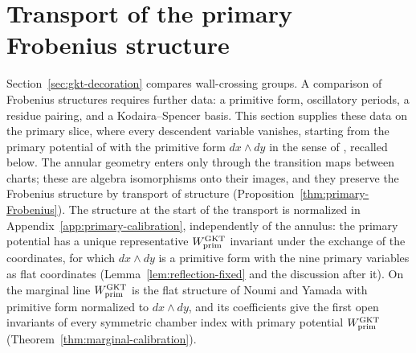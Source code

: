 \section{Transport of the primary Frobenius structure}
\label{sec:primary-frobenius}

Section~\ref{sec:gkt-decoration} compares wall-crossing groups.  A comparison
of Frobenius structures requires further data: a primitive form, oscillatory
periods, a residue pairing, and a Kodaira--Spencer basis.  This section
supplies these data on the primary slice, where every descendent variable
vanishes, starting from the primary potential of \cite{grossetal2022open}
with the primitive form $dx\wedge dy$ in the sense of
\cite[Def.~4.3]{grossetal2022open}, recalled below.  The annular geometry
enters only through the transition maps between charts; these are algebra
isomorphisms onto their images, and they preserve the Frobenius structure by
transport of structure (Proposition~\ref{thm:primary-Frobenius}).  The
structure at the start of the transport is normalized in
Appendix~\ref{app:primary-calibration}, independently of the annulus: the primary potential has a unique
representative $W^{\mathrm{GKT}}_{\mathrm{prim}}$ invariant under the exchange of the
coordinates, for which $dx\wedge dy$ is a primitive form with the nine
primary variables as flat coordinates (Lemma~\ref{lem:reflection-fixed} and
the discussion after it).
On the marginal line $W^{\mathrm{GKT}}_{\mathrm{prim}}$ is the flat structure of
Noumi and Yamada with primitive form normalized to $dx\wedge dy$, and its
coefficients give the first open invariants of every symmetric chamber index
with primary potential $W^{\mathrm{GKT}}_{\mathrm{prim}}$
(Theorem~\ref{thm:marginal-calibration}).

